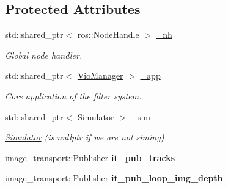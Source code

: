 \subsection*{Protected Attributes}
\begin{DoxyCompactItemize}
\item 
\mbox{\label{classov__msckf_1_1ROS1Visualizer_a5888fecd6f5e2505b9bc68b3e0d1bba0}} 
std\+::shared\+\_\+ptr$<$ ros\+::\+Node\+Handle $>$ \hyperlink{classov__msckf_1_1ROS1Visualizer_a5888fecd6f5e2505b9bc68b3e0d1bba0}{\+\_\+nh}
\begin{DoxyCompactList}\small\item\em Global node handler. \end{DoxyCompactList}\item 
\mbox{\label{classov__msckf_1_1ROS1Visualizer_a94f9aec2778d9739fa35391174e4215f}} 
std\+::shared\+\_\+ptr$<$ \hyperlink{classov__msckf_1_1VioManager}{Vio\+Manager} $>$ \hyperlink{classov__msckf_1_1ROS1Visualizer_a94f9aec2778d9739fa35391174e4215f}{\+\_\+app}
\begin{DoxyCompactList}\small\item\em Core application of the filter system. \end{DoxyCompactList}\item 
\mbox{\label{classov__msckf_1_1ROS1Visualizer_a3e28ea010550b2bbf938d505b172ba42}} 
std\+::shared\+\_\+ptr$<$ \hyperlink{classov__msckf_1_1Simulator}{Simulator} $>$ \hyperlink{classov__msckf_1_1ROS1Visualizer_a3e28ea010550b2bbf938d505b172ba42}{\+\_\+sim}
\begin{DoxyCompactList}\small\item\em \hyperlink{classov__msckf_1_1Simulator}{Simulator} (is nullptr if we are not sim\textquotesingle{}ing) \end{DoxyCompactList}\item 
\mbox{\label{classov__msckf_1_1ROS1Visualizer_aaee7e3fcfb1908ed245e04352810dbc3}} 
image\+\_\+transport\+::\+Publisher {\bfseries it\+\_\+pub\+\_\+tracks}
\item 
\mbox{\label{classov__msckf_1_1ROS1Visualizer_a6cb7aa0db30322fd15f128ee1eb3b234}} 
image\+\_\+transport\+::\+Publisher {\bfseries it\+\_\+pub\+\_\+loop\+\_\+img\+\_\+depth}

\end{DoxyCompactItemize}
